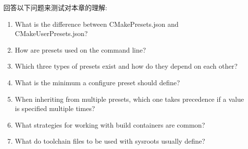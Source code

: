 回答以下问题来测试对本章的理解:

\begin{enumerate}
\item 
What is the difference between CMakePresets.json and CMakeUserPresets.json?

\item 
How are presets used on the command line?

\item 
Which three types of presets exist and how do they depend on each other?

\item 
What is the minimum a configure preset should define?

\item 
When inheriting from multiple presets, which one takes precedence if a value is specified multiple times?

\item 
What strategies for working with build containers are common?

\item 
What do toolchain files to be used with sysroots usually define?
\end{enumerate}